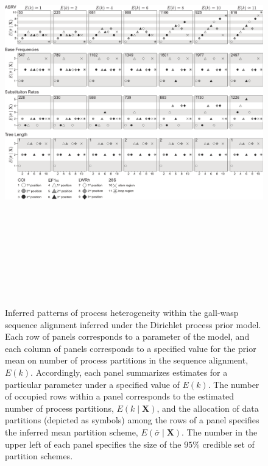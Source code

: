 \documentclass[11pt]{article}
\begin{document}
\begin{figure}[h] 
\centering 
\includegraphics[angle=90, height=175mm]{figure_2.pdf} 
\caption{Inferred patterns of process heterogeneity within the gall-wasp sequence alignment inferred under the Dirichlet process prior model.  Each row of panels corresponds to a parameter of the model, and each column of panels corresponds to a specified value for the prior mean on number of process partitions in the sequence alignment, $E(k)$.  Accordingly, each panel summarizes estimates for a particular parameter under a specified value of $E(k)$.  The number of occupied rows within a panel corresponds to the estimated number of process partitions, $E(k \mid \mathbf{X})$, and the allocation of data partitions (depicted as symbols) among the rows of a panel specifies the inferred mean partition scheme, $E(\bar{\sigma} \mid \mathbf{X})$.  The number in the upper left of each panel specifies the size of the $95\%$ credible set of partition schemes.}
\label{gall_wasps}
\end{figure} 
\end{document}
